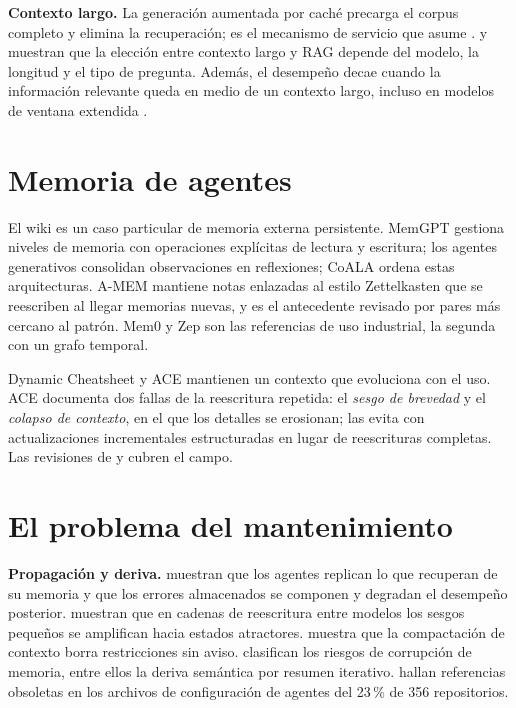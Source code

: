 \documentclass[11pt,letterpaper]{article}
\begin{document}
\textbf{Contexto largo.} La generación aumentada por caché \citep{chan2024} precarga el corpus completo y elimina la recuperación; es el mecanismo de servicio que asume \citet{huerta2026wicer}. \citet{li2024} y \citet{li2025lara} muestran que la elección entre contexto largo y RAG depende del modelo, la longitud y el tipo de pregunta. Además, el desempeño decae cuando la información relevante queda en medio de un contexto largo, incluso en modelos de ventana extendida \citep{liu2024}.

\section{Memoria de agentes}

El wiki es un caso particular de memoria externa persistente. MemGPT \citep{packer2023} gestiona niveles de memoria con operaciones explícitas de lectura y escritura; los agentes generativos \citep{park2023} consolidan observaciones en reflexiones; CoALA \citep{sumers2023} ordena estas arquitecturas. A-MEM \citep{xu2025amem} mantiene notas enlazadas al estilo Zettelkasten que se reescriben al llegar memorias nuevas, y es el antecedente revisado por pares más cercano al patrón. Mem0 \citep{chhikara2025} y Zep \citep{rasmussen2025} son las referencias de uso industrial, la segunda con un grafo temporal.

Dynamic Cheatsheet \citep{suzgun2025} y ACE \citep{zhang2025ace} mantienen un contexto que evoluciona con el uso. ACE documenta dos fallas de la reescritura repetida: el \emph{sesgo de brevedad} y el \emph{colapso de contexto}, en el que los detalles se erosionan; las evita con actualizaciones incrementales estructuradas en lugar de reescrituras completas. Las revisiones de \citet{hu2025} y \citet{huang2026survey} cubren el campo.

\section{El problema del mantenimiento}

\textbf{Propagación y deriva.} \citet{xiong2025} muestran que los agentes replican lo que recuperan de su memoria y que los errores almacenados se componen y degradan el desempeño posterior. \citet{perez2024} muestran que en cadenas de reescritura entre modelos los sesgos pequeños se amplifican hacia estados atractores. \citet{chen2026} muestra que la compactación de contexto borra restricciones sin aviso. \citet{lam2026} clasifican los riesgos de corrupción de memoria, entre ellos la deriva semántica por resumen iterativo. \citet{treude2026} hallan referencias obsoletas en los archivos de configuración de agentes del 23\,\% de 356 repositorios.
\end{document}
